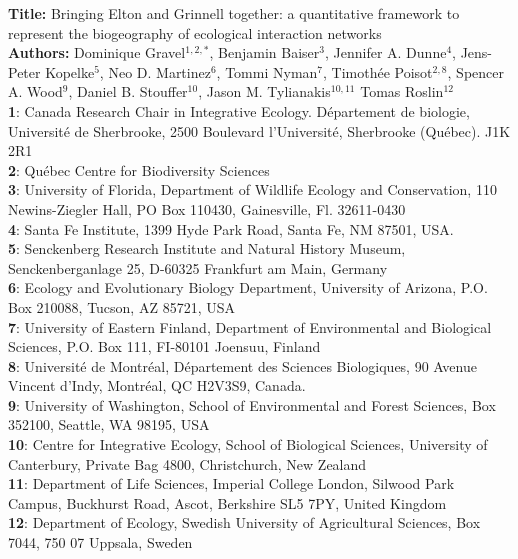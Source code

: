 \documentclass[12pt]{article}
\begin{document}
\linenumbers
\modulolinenumbers[1]

\textbf{Title:} Bringing Elton and Grinnell together: a quantitative framework
to represent the biogeography of ecological interaction networks\\

\textbf{Authors:} Dominique Gravel$^{1,2,*}$, Benjamin Baiser$^{3}$, Jennifer
A. Dunne$^{4}$, Jens-Peter Kopelke$^{5}$, Neo D. Martinez$^{6}$, Tommi
Nyman$^{7}$, Timothée Poisot$^{2,8}$, Spencer A. Wood$^{9}$, Daniel B.
Stouffer$^{10}$, Jason M. Tylianakis$^{10,11}$ Tomas Roslin$^{12}$ \\

\textbf{1}: Canada Research Chair in Integrative Ecology. Département de
biologie, Université de Sherbrooke, 2500 Boulevard l'Université,
Sherbrooke (Québec). J1K 2R1\\
\textbf{2}: Québec Centre for Biodiversity Sciences\\
\textbf{3}: University of Florida, Department of Wildlife Ecology and Conservation, 110 Newins-Ziegler Hall, PO Box 110430, Gainesville, Fl. 32611-0430 \\
\textbf{4}: Santa Fe Institute, 1399 Hyde Park Road, Santa Fe, NM 87501, USA.\\
\textbf{5}: Senckenberg Research Institute and Natural History Museum, Senckenberganlage 25, D-60325 Frankfurt am Main, Germany\\
\textbf{6}: Ecology and Evolutionary Biology Department, University of Arizona, P.O. Box 210088, Tucson, AZ 85721, USA\\
\textbf{7}: University of Eastern Finland, Department of Environmental and Biological Sciences, P.O. Box 111, FI-80101 Joensuu, Finland\\
\textbf{8}: Université de Montréal, Département des Sciences Biologiques, 90 Avenue Vincent d’Indy, Montréal, QC H2V3S9, Canada.\\
\textbf{9}: University of Washington, School of Environmental and Forest Sciences,
Box 352100, Seattle, WA 98195, USA\\
\textbf{10}: Centre for Integrative Ecology, School of Biological Sciences, University of Canterbury, Private Bag 4800, Christchurch, New Zealand\\
\textbf{11}: Department of Life Sciences, Imperial College London, Silwood Park Campus, 
Buckhurst Road, Ascot, Berkshire SL5 7PY, United Kingdom\\
\textbf{12}: Department of Ecology, Swedish University of Agricultural Sciences, Box 7044, 750 07 Uppsala, Sweden\\
\end{document}
